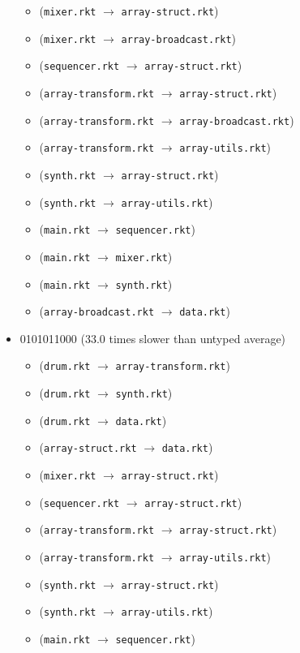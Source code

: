 \documentclass{article}
\newcommand{\mono}[1]{\texttt{#1}}
\begin{document}
\begin{itemize}
\begin{itemize}
  \item (\mono{mixer.rkt} $\rightarrow$ \mono{array-struct.rkt})
  \item (\mono{mixer.rkt} $\rightarrow$ \mono{array-broadcast.rkt})
  \item (\mono{sequencer.rkt} $\rightarrow$ \mono{array-struct.rkt})
  \item (\mono{array-transform.rkt} $\rightarrow$ \mono{array-struct.rkt})
  \item (\mono{array-transform.rkt} $\rightarrow$ \mono{array-broadcast.rkt})
  \item (\mono{array-transform.rkt} $\rightarrow$ \mono{array-utils.rkt})
  \item (\mono{synth.rkt} $\rightarrow$ \mono{array-struct.rkt})
  \item (\mono{synth.rkt} $\rightarrow$ \mono{array-utils.rkt})
  \item (\mono{main.rkt} $\rightarrow$ \mono{sequencer.rkt})
  \item (\mono{main.rkt} $\rightarrow$ \mono{mixer.rkt})
  \item (\mono{main.rkt} $\rightarrow$ \mono{synth.rkt})
  \item (\mono{array-broadcast.rkt} $\rightarrow$ \mono{data.rkt})
  \end{itemize}
\item 0101011000 (33.0 times slower than untyped average)
  \begin{itemize}
  \item (\mono{drum.rkt} $\rightarrow$ \mono{array-transform.rkt})
  \item (\mono{drum.rkt} $\rightarrow$ \mono{synth.rkt})
  \item (\mono{drum.rkt} $\rightarrow$ \mono{data.rkt})
  \item (\mono{array-struct.rkt} $\rightarrow$ \mono{data.rkt})
  \item (\mono{mixer.rkt} $\rightarrow$ \mono{array-struct.rkt})
  \item (\mono{sequencer.rkt} $\rightarrow$ \mono{array-struct.rkt})
  \item (\mono{array-transform.rkt} $\rightarrow$ \mono{array-struct.rkt})
  \item (\mono{array-transform.rkt} $\rightarrow$ \mono{array-utils.rkt})
  \item (\mono{synth.rkt} $\rightarrow$ \mono{array-struct.rkt})
  \item (\mono{synth.rkt} $\rightarrow$ \mono{array-utils.rkt})
  \item (\mono{main.rkt} $\rightarrow$ \mono{sequencer.rkt})

\end{itemize}
\end{itemize}
\end{document}
